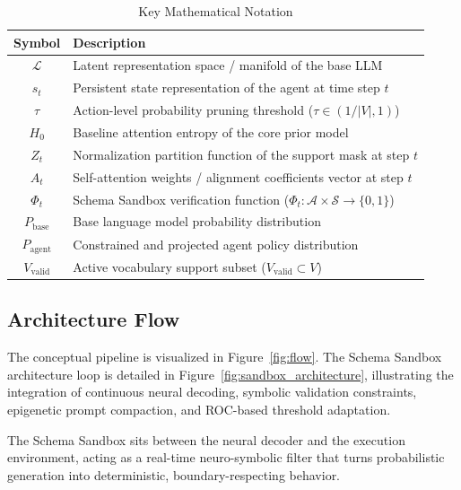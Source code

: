 \documentclass[10pt,journal,compsoc]{IEEEtran}
\begin{document}
\begin{table}[t]
\centering
\caption{Key Mathematical Notation}
\label{tab:notation}
\begin{tabular}{cp{5.5cm}}
\toprule
\textbf{Symbol} & \textbf{Description} \\
\midrule
$\mathcal{L}$ & Latent representation space / manifold of the base LLM \\
$s_t$ & Persistent state representation of the agent at time step $t$ \\
$\tau$ & Action-level probability pruning threshold ($\tau \in (1/|V|, 1)$) \\
$H_0$ & Baseline attention entropy of the core prior model \\
$Z_t$ & Normalization partition function of the support mask at step $t$ \\
$A_t$ & Self-attention weights / alignment coefficients vector at step $t$ \\
$\Phi_t$ & Schema Sandbox verification function ($\Phi_t: \mathcal{A} \times \mathcal{S} \to \{0, 1\}$) \\
$P_{\text{base}}$ & Base language model probability distribution \\
$P_{\text{agent}}$ & Constrained and projected agent policy distribution \\
$V_{\text{valid}}$ & Active vocabulary support subset ($V_{\text{valid}} \subset V$) \\
\bottomrule
\end{tabular}
\end{table}

\subsection{Architecture Flow}
The conceptual pipeline is visualized in Figure~\ref{fig:flow}. The Schema Sandbox architecture loop is detailed in Figure~\ref{fig:sandbox_architecture}, illustrating the integration of continuous neural decoding, symbolic validation constraints, epigenetic prompt compaction, and ROC-based threshold adaptation.

The Schema Sandbox sits between the neural decoder and the execution environment, acting as a real-time neuro-symbolic filter that turns probabilistic generation into deterministic, boundary-respecting behavior.
\end{document}
